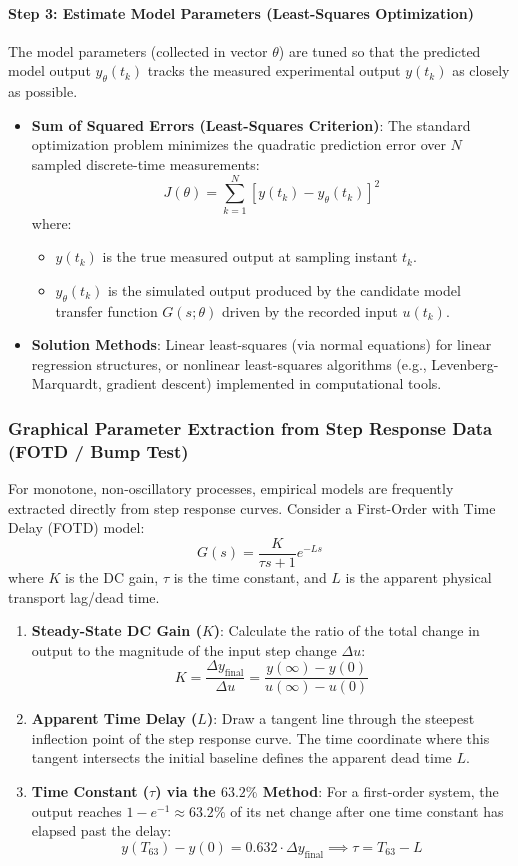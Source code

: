 \documentclass[12pt,onecolumn,twoside ]{article}
\begin{document}
	\paragraph{Step 3: Estimate Model Parameters (Least-Squares Optimization)}
	The model parameters (collected in vector $\theta$) are tuned so that the predicted model output $y_\theta(t_k)$ tracks the measured experimental output $y(t_k)$ as closely as possible.
	\begin{itemize}
		\item
		\textbf{Sum of Squared Errors (Least-Squares Criterion)}: The standard optimization problem minimizes the quadratic prediction error over $N$ sampled discrete-time measurements: \[
		J(\theta) = \sum_{k=1}^{N} \left[ y(t_k) - y_\theta(t_k) \right]^2
		\] where:
		\begin{itemize}
			\item
			$y(t_k)$ is the true measured output at sampling instant $t_k$.
			\item
			$y_\theta(t_k)$ is the simulated output produced by the candidate model transfer function $G(s; \theta)$ driven by the recorded input $u(t_k)$.
		\end{itemize}
		\item
		\textbf{Solution Methods}: Linear least-squares (via normal equations) for linear regression structures, or nonlinear least-squares algorithms (e.g., Levenberg-Marquardt, gradient descent) implemented in computational tools.
	\end{itemize}
	
	\subsubsection{Graphical Parameter Extraction from Step Response Data (FOTD / Bump Test)}
	For monotone, non-oscillatory processes, empirical models are frequently extracted directly from step response curves. Consider a First-Order with Time Delay (FOTD) model: \[
	G(s) = \frac{K}{\tau s + 1} e^{-Ls}
	\] where $K$ is the DC gain, $\tau$ is the time constant, and $L$ is the apparent physical transport lag/dead time.
	
	\begin{enumerate}
		\item
		\textbf{Steady-State DC Gain ($K$)}: Calculate the ratio of the total change in output to the magnitude of the input step change $\Delta u$: \[
		K = \frac{\Delta y_{\text{final}}}{\Delta u} = \frac{y(\infty) - y(0)}{u(\infty) - u(0)}
		\]
		\item
		\textbf{Apparent Time Delay ($L$)}: Draw a tangent line through the steepest inflection point of the step response curve. The time coordinate where this tangent intersects the initial baseline defines the apparent dead time $L$.
		\item
		\textbf{Time Constant ($\tau$) via the $63.2\%$ Method}: For a first-order system, the output reaches $1 - e^{-1} \approx 63.2\%$ of its net change after one time constant has elapsed past the delay: \[
		y(T_{63}) - y(0) = 0.632 \cdot \Delta y_{\text{final}} \implies \tau = T_{63} - L
		\]
	\end{enumerate}
	
\end{document}
